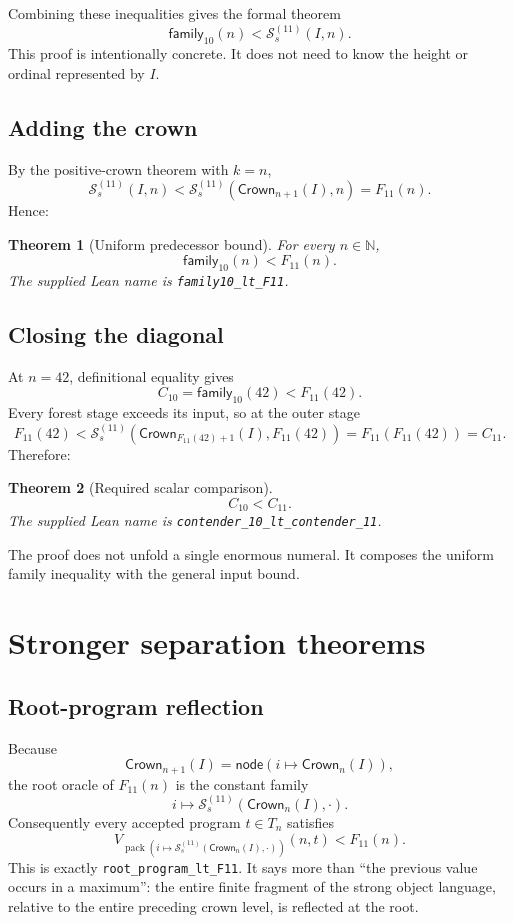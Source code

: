\documentclass[11pt]{article}
\newtheorem{theorem}{Theorem}[section]
\theoremstyle{definition}
\theoremstyle{remark}
\newcommand{\N}{\mathbb{N}}
\newcommand{\code}[1]{\texttt{#1}}
\newcommand{\Sstage}{\mathcal{S}^{(11)}}
\newcommand{\Crown}{\mathsf{Crown}}
\newcommand{\FamTen}{\mathsf{family}_{10}}
\newcommand{\Feleven}{F_{11}}
\newcommand{\ContEleven}{C_{11}}
\newcommand{\ContTen}{C_{10}}
\begin{document}
Combining these inequalities gives the formal theorem
\[
  \FamTen(n)<\Sstage_s(I,n).
\]
This proof is intentionally concrete.  It does not need to know the height or
ordinal represented by $I$.

\subsection{Adding the crown}

By the positive-crown theorem with $k=n$,
\[
  \Sstage_s(I,n)<\Sstage_s(\Crown_{n+1}(I),n)=\Feleven(n).
\]
Hence:

\begin{theorem}[Uniform predecessor bound]
For every $n\in\N$,
\[
  \FamTen(n)<\Feleven(n).
\]
The supplied Lean name is \code{family10\_lt\_F11}.
\end{theorem}

\subsection{Closing the diagonal}

At $n=42$, definitional equality gives
\[
  \ContTen=\FamTen(42)<\Feleven(42).
\]
Every forest stage exceeds its input, so at the outer stage
\[
  \Feleven(42)
  <\Sstage_s(\Crown_{\Feleven(42)+1}(I),\Feleven(42))
  =\Feleven(\Feleven(42))=\ContEleven.
\]
Therefore:

\begin{theorem}[Required scalar comparison]
\[
  \ContTen<\ContEleven.
\]
The supplied Lean name is
\code{contender\_10\_lt\_contender\_11}.
\end{theorem}

The proof does not unfold a single enormous numeral.  It composes the uniform
family inequality with the general input bound.

\section{Stronger separation theorems}

\subsection{Root-program reflection}

Because
\[
  \Crown_{n+1}(I)=
  \mathsf{node}(i\mapsto\Crown_n(I)),
\]
the root oracle of $\Feleven(n)$ is the constant family
\[
  i\mapsto \Sstage_s(\Crown_n(I),\cdot).
\]
Consequently every accepted program $t\in T_n$ satisfies
\[
V_{\operatorname{pack}
  (i\mapsto \Sstage_s(\Crown_n(I),\cdot))}(n,t)<\Feleven(n).
\]
This is exactly \code{root\_program\_lt\_F11}.  It says more than
``the previous value occurs in a maximum'': the entire finite fragment of the
strong object language, relative to the entire preceding crown level, is
reflected at the root.
\end{document}
